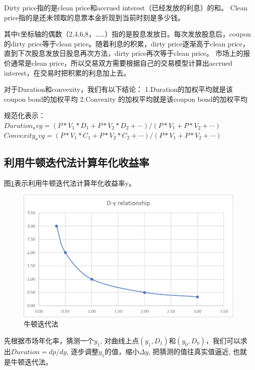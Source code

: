 Dirty price指的是clean price和accrued interest（已经发放的利息）的和。
Clean price指的是还未领取的息票本金折现到当前时刻是多少钱。

其中t坐标轴的偶数（2,4,6,8，……）指的是股息发放日。每次发放股息后，coupon的dirty price等于clean price。随着利息的积累，dirty price逐渐高于clean price，直到下次股息发放日股息再次方法，dirty price再次等于clean price。
市场上的报价通常是clean price，所以交易双方需要根据自己的交易模型计算出accrued interest，在交易时把积累的利息加上去。

对于Duration和convexity，我们有以下结论：
1.Duration的加权平均就是该coupon bond的加权平均
2.Convexity 的加权平均就是该coupon bond的加权平均

规范化表示：
$Duration_avg=(P*V_1*D_1+P*V_2*D_2+ \cdots)/(P*V_1+P*V_2+\cdots)$
$Convexity_avg=(P*V_1*C_1+P*V_2*C_2+\cdots)/(P*V_1+P*V_2+\cdots)$



\subsection{利用牛顿迭代法计算年化收益率}
图\ref{fig:sys.param}表示利用牛顿迭代法计算年化收益率y。
\begin{figure}[htbp]
\begin{center}
\includegraphics[width=16cm]{img//Newton.PNG}
\caption{牛顿迭代法}
\label{fig:sys.param}
\end{center}
\end{figure}

先根据市场年化率，猜测一个$y_1$,
对曲线上点$(y_1, D_1)$和$(y_0, D_0)$，我们可以求出$Duration = dp/dy$,
逐步调整$y_1$的值，缩小$\Delta y$,
把猜测的值往真实值逼近,
也就是牛顿迭代法。


